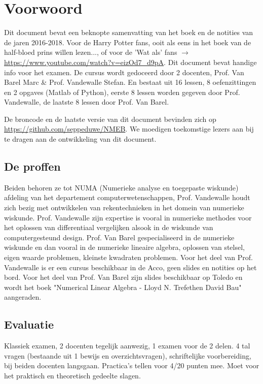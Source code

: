 \chapter*{Voorwoord}
Dit document bevat een beknopte samenvatting van het boek en de notities van de jaren 2016-2018. Voor de Harry Potter fans, ooit als eens in het boek van de half-bloed prins willen lezen..., of voor de 'Wat als' fans $\rightarrow$ \url{https://www.youtube.com/watch?v=eizOd7_d9pA}. Dit document bevat handige info voor het examen.  De cursus wordt gedoceerd door 2 docenten, Prof. Van Barel Marc \& Prof. Vandewalle Stefan. En bestaat uit 16 lessen, 8 oefenzittingen en 2 opgaves (Matlab of Python), eerste 8 lessen worden gegeven door Prof. Vandewalle, de laatste 8 lessen door Prof. Van Barel. 

De broncode en de laatste versie van dit document bevinden zich op \url{https://github.com/seppeduwe/NMEB}. We moedigen toekomstige lezers aan bij te dragen aan de ontwikkeling van dit document.

\section*{De proffen}
Beiden behoren ze tot NUMA (Numerieke analyse en toegepaste wiskunde) afdeling van het departement computerwetenschappen, Prof. Vandewalle houdt zich bezig met ontwikkelen van rekentechnieken in het domein van numerieke wiskunde. Prof. Vandewalle zijn expertise is vooral in numerieke methodes voor het oplossen van differentiaal vergelijken alsook in de wiskunde van computergesteund design. Prof. Van Barel gespecialiseerd in de numerieke wiskunde en dan vooral in de numerieke lineaire algebra, oplossen van stelsel, eigen waarde problemen, kleinste kwadraten problemen.
Voor het deel van Prof. Vandewalle is er een cursus beschikbaar in de Acco, geen slides en notities op het bord. Voor het deel van Prof. Van Barel zijn slides beschikbaar op Toledo en wordt het boek "Numerical Linear Algebra - Lloyd N. Trefethen David Bau" aangeraden.

\section*{Evaluatie}
Klassiek examen, 2 docenten tegelijk aanwezig, 1 examen voor de 2 delen. 4 tal vragen (bestaande uit 1 bewijs en overzichtsvragen), schriftelijke voorbereiding, bij beiden docenten langsgaan. Practica's tellen voor 4/20 punten mee. Moet voor het praktisch en theoretisch gedeelte slagen.


